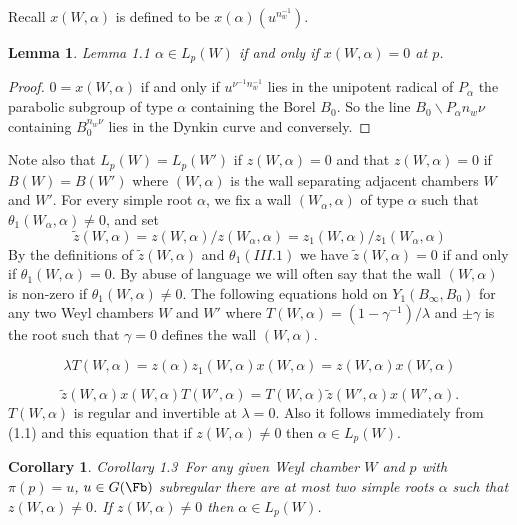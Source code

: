 \documentclass{memo-l}
\newtheorem{lemma}[theorem]{Lemma}
\newtheorem{corollary}[theorem]{Corollary}
\theoremstyle{definition}
\theoremstyle{remark}
\numberwithin{section}{chapter}
\numberwithin{equation}{chapter}
\begin{document}
Recall $x(W,{\alpha})$ is defined to be $x({\alpha})(u^{n_w^{-1}})$.

\begin{lemma}{Lemma 1.1} ${\alpha} \in L_{p}(W)$ if and only if
$x(W,{\alpha}) = 0$ at $p$.
\end{lemma}

\medpagebreak

\begin{proof}  $0 = x(W,{\alpha})$ if and only if $u^{\nu^{-1}n_w^{-1}}$ 
lies in the unipotent radical of $P_{{\alpha}}$
the parabolic subgroup of type ${\alpha}$ containing the Borel $B_{0}$.  So
the line $B_{0}\backslash P_{{\alpha}}n_{w}{\nu}$ containing $B_{0}^{n_w\nu}$
lies in the Dynkin curve and conversely.
\end{proof} 		       

{\medskip}

   Note also that $L_{p}(W) = L_{p}(W')$ if $z(W,{\alpha}) = 0$ and that
$z(W,{\alpha}) = 0$ if $B(W) = B(W')$ where $(W,{\alpha})$ is the wall
separating adjacent chambers $W$ and $W'$.  For every simple root
${\alpha}$, we fix a wall $(W_{{\alpha}},{\alpha})$ of type ${\alpha}$ such
that ${\theta}_{1}(W_{{\alpha}},{\alpha})\ne 0$, and set
$$
\tilde{z} (W,{\alpha}) = z(W,{\alpha})/z(W_{{\alpha}},{\alpha}) =
z_{1}(W,{\alpha})/z_{1}(W_{{\alpha}},{\alpha})
$$
By the definitions of $\tilde z (W,{\alpha})$ and ${\theta}_{1} (III.1)$ we
have $\tilde z (W,{\alpha}) = 0$ if and only if ${\theta}_{1}(W,{\alpha}) =
0$.  By abuse of language we will often say that the wall $(W,{\alpha})$ is
non-zero if ${\theta}_{1}(W,{\alpha})\ne 0$.  The following equations hold
on $Y_{1}(B_{{\infty}},B_{0})$ for any two Weyl chambers $W$ and $W'$ where
$T(W,{\alpha}) = (1-{\gamma}^{-1})/{\lambda}$ and ${\pm}{\gamma}$ is
the root such that ${\gamma} = 0$ defines the wall $(W,{\alpha})$.


$$
\lambda T(W,{\alpha}) = z({\alpha})z_{1}(W,{\alpha})x(W,{\alpha}) =
z(W,{\alpha})x(W,{\alpha})
$$
\enddefinition

$$
\tilde {z} (W,{\alpha})x(W,{\alpha})T(W',{\alpha}) = T(W,{\alpha})\tilde z
(W',{\alpha})x(W',{\alpha}) .
$$
$T(W,{\alpha})$ is regular and invertible at ${\lambda} = 0$.  Also it
follows immediately from (1.1) and this equation that if
$z(W,{\alpha})\ne 0$ then ${\alpha} \in L_{p}(W)$.

\medskip

\begin{corollary}{Corollary 1.3}\ For any given Weyl chamber $W$ and $p$ with
${\pi}(p) = u$, $u \in G(\Fb)$ subregular there are at most two simple
roots ${\alpha}$ such that $z(W,{\alpha})\ne 0$.  If $z(W,{\alpha})\ne 0$
then ${\alpha} \in L_{p}(W)$.
\end{corollary}
\end{document}
